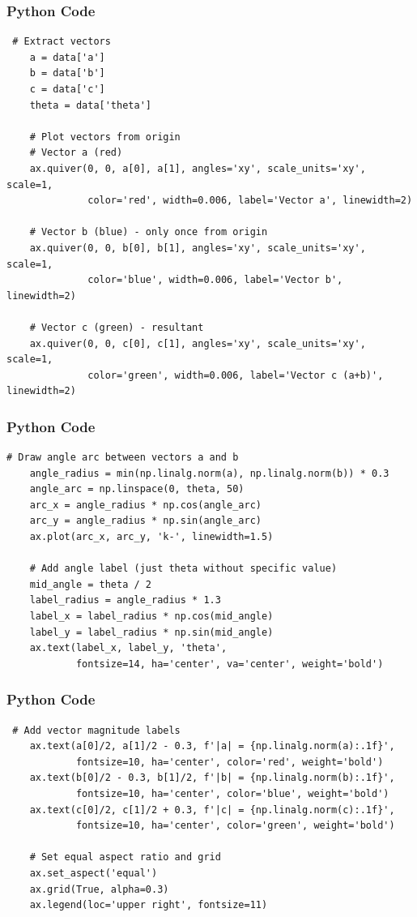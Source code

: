 \documentclass{beamer}
\begin{document}
\begin{frame}[fragile]
    \frametitle{Python Code}
    \begin{lstlisting}
 # Extract vectors
    a = data['a']
    b = data['b']
    c = data['c']
    theta = data['theta']

    # Plot vectors from origin
    # Vector a (red)
    ax.quiver(0, 0, a[0], a[1], angles='xy', scale_units='xy', scale=1, 
              color='red', width=0.006, label='Vector a', linewidth=2)

    # Vector b (blue) - only once from origin
    ax.quiver(0, 0, b[0], b[1], angles='xy', scale_units='xy', scale=1, 
              color='blue', width=0.006, label='Vector b', linewidth=2)

    # Vector c (green) - resultant
    ax.quiver(0, 0, c[0], c[1], angles='xy', scale_units='xy', scale=1, 
              color='green', width=0.006, label='Vector c (a+b)', linewidth=2)
    \end{lstlisting}
\end{frame}

\begin{frame}[fragile]
    \frametitle{Python Code}
    \begin{lstlisting}
# Draw angle arc between vectors a and b
    angle_radius = min(np.linalg.norm(a), np.linalg.norm(b)) * 0.3
    angle_arc = np.linspace(0, theta, 50)
    arc_x = angle_radius * np.cos(angle_arc)
    arc_y = angle_radius * np.sin(angle_arc)
    ax.plot(arc_x, arc_y, 'k-', linewidth=1.5)

    # Add angle label (just theta without specific value)
    mid_angle = theta / 2
    label_radius = angle_radius * 1.3
    label_x = label_radius * np.cos(mid_angle)
    label_y = label_radius * np.sin(mid_angle)
    ax.text(label_x, label_y, 'theta', 
            fontsize=14, ha='center', va='center', weight='bold')
    \end{lstlisting}
\end{frame}

\begin{frame}[fragile]
    \frametitle{Python Code}
    \begin{lstlisting}
 # Add vector magnitude labels
    ax.text(a[0]/2, a[1]/2 - 0.3, f'|a| = {np.linalg.norm(a):.1f}', 
            fontsize=10, ha='center', color='red', weight='bold')
    ax.text(b[0]/2 - 0.3, b[1]/2, f'|b| = {np.linalg.norm(b):.1f}', 
            fontsize=10, ha='center', color='blue', weight='bold')
    ax.text(c[0]/2, c[1]/2 + 0.3, f'|c| = {np.linalg.norm(c):.1f}', 
            fontsize=10, ha='center', color='green', weight='bold')

    # Set equal aspect ratio and grid
    ax.set_aspect('equal')
    ax.grid(True, alpha=0.3)
    ax.legend(loc='upper right', fontsize=11)
    \end{lstlisting}
\end{frame}
\end{document}

